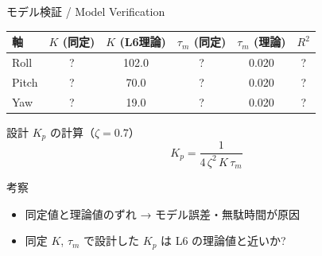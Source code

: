 \begin{frame}{モデル検証 / Model Verification}
  \vspace{-0.3em}

  {\small
  \begin{table}
    \centering
    \begin{tabular}{lccccc}
      \hline
      \textbf{軸} & \textbf{$K$ (同定)} & \textbf{$K$ (L6理論)} & \textbf{$\tau_m$ (同定)} & \textbf{$\tau_m$ (理論)} & \textbf{$R^2$} \\
      \hline
      Roll  & ? & 102.0 & ? & 0.020 & ? \\
      Pitch & ? &  70.0 & ? & 0.020 & ? \\
      Yaw   & ? &  19.0 & ? & 0.020 & ? \\
      \hline
    \end{tabular}
  \end{table}
  }

  \vspace{0.2em}

  \begin{block}{設計 $K_p$ の計算（$\zeta = 0.7$）}
    \vspace{-0.5em}
    \[
      K_p = \frac{1}{4\,\zeta^2\,K\,\tau_m}
    \]
    \vspace{-1em}
  \end{block}

  \vspace{0.2em}

  \begin{exampleblock}{考察}
    {\footnotesize
    \begin{itemize}\setlength{\itemsep}{0pt}
      \item 同定値と理論値のずれ → モデル誤差・無駄時間が原因
      \item 同定 $K$, $\tau_m$ で設計した $K_p$ は L6 の理論値と近いか?
    \end{itemize}
    }
  \end{exampleblock}
\end{frame}

